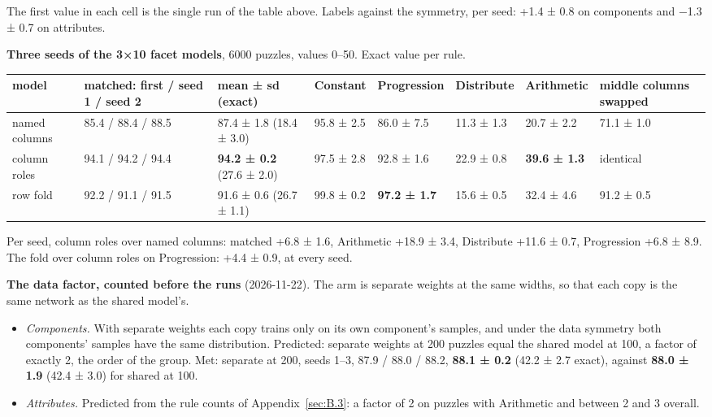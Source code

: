 The first value in each cell is the single run of the table above. Labels against the symmetry, per seed: +1.4 ± 0.8 on components and −1.3 ± 0.7 on attributes.

\textbf{Three seeds of the 3×10 facet models}, 6000 puzzles, values 0–50. Exact value per rule.

\begin{center}\small
\begin{tabularx}{\linewidth}{@{}lYYllllY@{}}
\toprule
model & matched: first / seed 1 / seed 2 & mean ± sd (exact) & Constant & Progression & Distribute & Arithmetic & middle columns swapped \\
\midrule
named columns & 85.4 / 88.4 / 88.5 & 87.4 ± 1.8 (18.4 ± 3.0) & 95.8 ± 2.5 & 86.0 ± 7.5 & 11.3 ± 1.3 & 20.7 ± 2.2 & 71.1 ± 1.0 \\
column roles & 94.1 / 94.2 / 94.4 & \textbf{94.2 ± 0.2} (27.6 ± 2.0) & 97.5 ± 2.8 & 92.8 ± 1.6 & 22.9 ± 0.8 & \textbf{39.6 ± 1.3} & identical \\
row fold & 92.2 / 91.1 / 91.5 & 91.6 ± 0.6 (26.7 ± 1.1) & 99.8 ± 0.2 & \textbf{97.2 ± 1.7} & 15.6 ± 0.5 & 32.4 ± 4.6 & 91.2 ± 0.5 \\
\bottomrule
\end{tabularx}
\end{center}

Per seed, column roles over named columns: matched +6.8 ± 1.6, Arithmetic +18.9 ± 3.4, Distribute +11.6 ± 0.7, Progression +6.8 ± 8.9. The fold over column roles on Progression: +4.4 ± 0.9, at every seed.

\textbf{The data factor, counted before the runs} (2026-11-22). The arm is separate weights at the same widths, so that each copy is the same network as the shared model's.

\begin{itemize}
\item \emph{Components.} With separate weights each copy trains only on its own component's samples, and under the data symmetry both components' samples have the same distribution. Predicted: separate weights at 200 puzzles equal the shared model at 100, a factor of exactly 2, the order of the group. Met: separate at 200, seeds 1–3, 87.9 / 88.0 / 88.2, \textbf{88.1 ± 0.2} (42.2 ± 2.7 exact), against \textbf{88.0 ± 1.9} (42.4 ± 3.0) for shared at 100.
\item \emph{Attributes.} Predicted from the rule counts of Appendix~\ref{sec:B.3}: a factor of 2 on puzzles with Arithmetic and between 2 and 3 overall.
\end{itemize}

